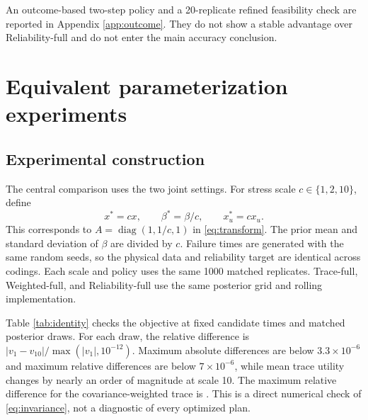 \documentclass[a4paper,fleqn]{cas-sc}
\begin{document}
\begin{table}[t]
\centering
\caption{Mean planning time per replicate in seconds, excluding likelihood fitting.}
\label{tab:computation}
\scriptsize\setlength{\tabcolsep}{2pt}
\end{table}

An outcome-based two-step policy and a 20-replicate refined feasibility check are reported in Appendix \ref{app:outcome}. They do not show a stable advantage over Reliability-full and do not enter the main accuracy conclusion.

\section{Equivalent parameterization experiments}

\subsection{Experimental construction}

The central comparison uses the two joint settings. For stress scale $c\in\{1,2,10\}$, define
\begin{equation}
x^*=cx,\qquad \beta^*=\beta/c,\qquad x_u^*=cx_u.
\end{equation}
This corresponds to $A=\operatorname{diag}(1,1/c,1)$ in \eqref{eq:transform}. The prior mean and standard deviation of $\beta$ are divided by $c$. Failure times are generated with the same random seeds, so the physical data and reliability target are identical across codings. Each scale and policy uses the same 1000 matched replicates. Trace-full, Weighted-full, and Reliability-full use the same posterior grid and rolling implementation.

Table \ref{tab:identity} checks the objective at fixed candidate times and matched posterior draws. For each draw, the relative difference is $|v_1-v_{10}|/\max(|v_1|,10^{-12})$. Maximum absolute differences are below $3.3\times10^{-6}$ and maximum relative differences are below $7\times10^{-6}$, while mean trace utility changes by nearly an order of magnitude at scale 10. The maximum relative difference for the covariance-weighted trace is \MaxWeightedIdentityRelative. This is a direct numerical check of \eqref{eq:invariance}, not a diagnostic of every optimized plan.

\begin{table}[t]
\centering
\caption{Objective checks under equivalent stress codings.}
\label{tab:identity}
\resizebox{\textwidth}{!}{}
\end{table}
\end{document}
